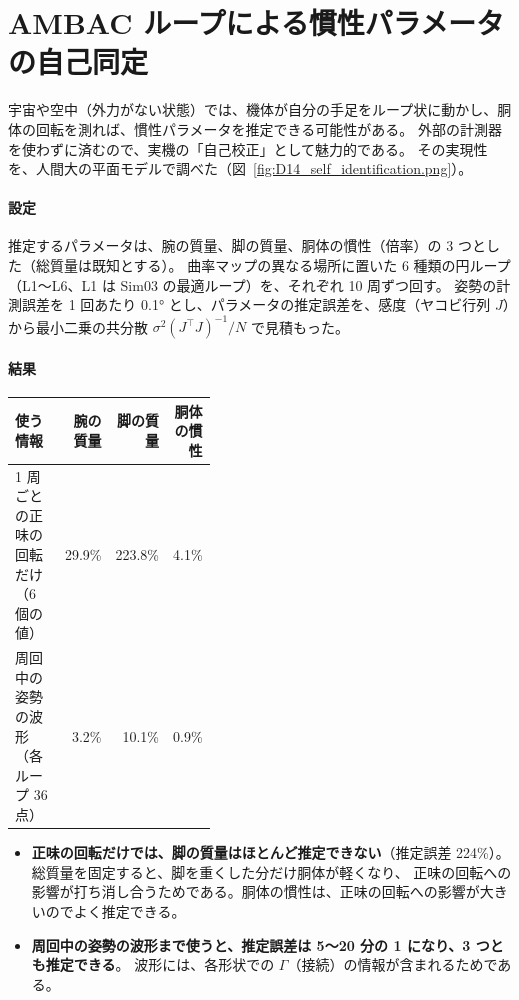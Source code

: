 \section{AMBAC ループによる慣性パラメータの自己同定}

宇宙や空中（外力がない状態）では、機体が自分の手足をループ状に動かし、胴体の回転を測れば、慣性パラメータを推定できる可能性がある。
外部の計測器を使わずに済むので、実機の「自己校正」として魅力的である。
その実現性を、人間大の平面モデルで調べた（図~\ref{fig:D14_self_identification.png}）。

\paragraph{設定}
推定するパラメータは、腕の質量、脚の質量、胴体の慣性（倍率）の 3 つとした（総質量は既知とする）。
曲率マップの異なる場所に置いた 6 種類の円ループ（L1〜L6、L1 は Sim03 の最適ループ）を、それぞれ 10 周ずつ回す。
姿勢の計測誤差を 1 回あたり 0.1° とし、パラメータの推定誤差を、感度（ヤコビ行列 $J$）から最小二乗の共分散 $\sigma^2(J^\top J)^{-1}/N$ で見積もった。

\paragraph{結果}
\begin{longtable}{p{0.40\linewidth}rrr}
\toprule
使う情報 & 腕の質量 & 脚の質量 & 胴体の慣性 \\ \midrule \endhead
1 周ごとの正味の回転だけ（6 個の値） & 29.9\% & 223.8\% & 4.1\% \\
周回中の姿勢の波形（各ループ 36 点） & 3.2\% & 10.1\% & 0.9\% \\
\bottomrule
\end{longtable}

\begin{itemize}
\item \textbf{正味の回転だけでは、脚の質量はほとんど推定できない}（推定誤差 224\%）。総質量を固定すると、脚を重くした分だけ胴体が軽くなり、
  正味の回転への影響が打ち消し合うためである。胴体の慣性は、正味の回転への影響が大きいのでよく推定できる。
\item \textbf{周回中の姿勢の波形まで使うと、推定誤差は 5〜20 分の 1 になり、3 つとも推定できる}。
  波形には、各形状での $\Gamma$（接続）の情報が含まれるためである。
\end{itemize}


